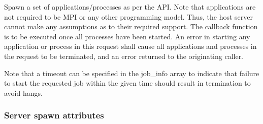 
\optattrend

\descr

Spawn a set of applications/processes as per the  API.
Note that applications are not required to be \ac{MPI} or any other programming model.
Thus, the host server cannot make any assumptions as to their required support.
The callback function is to be executed once all processes have been started.
An error in starting any application or process in this request shall cause all applications and processes in the request to be terminated, and an error returned to the originating caller.

Note that a timeout can be specified in the job_info array to indicate that failure to start the requested job within the given time should result in termination to avoid hangs.

\subsubsection{Server spawn attributes}

%
%


